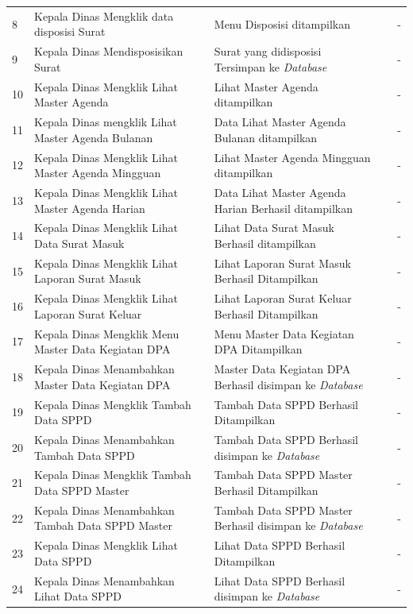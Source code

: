 \begin{enumerate}
{\begin{longtable}{p{0.5cm} p{4cm} p{5cm} p{0.5cm} p{1cm}}
			8 & Kepala Dinas Mengklik data disposisi Surat & Menu Disposisi ditampilkan & \checkmark & -\\
			9 & Kepala Dinas Mendisposisikan Surat  & Surat yang didisposisi Tersimpan ke \textit{Database} & \checkmark & -\\
			10 & Kepala Dinas Mengklik Lihat Master Agenda & Lihat Master Agenda ditampilkan & \checkmark & -\\		
			11 & Kepala Dinas mengklik Lihat Master Agenda Bulanan & Data Lihat Master Agenda Bulanan ditampilkan & \checkmark & -\\
			12 & Kepala Dinas Mengklik Lihat Master Agenda Mingguan & Lihat Master Agenda Mingguan ditampilkan  & \checkmark & -\\		
			13 & Kepala Dinas Mengklik Lihat Master Agenda Harian & Data Lihat Master Agenda Harian Berhasil ditampilkan  & \checkmark & -\\
			14 & Kepala Dinas Mengklik Lihat Data Surat Masuk & Lihat Data Surat Masuk Berhasil ditampilkan  & \checkmark & -\\
			15 & Kepala Dinas Mengklik Lihat Laporan  Surat Masuk & Lihat Laporan  Surat Masuk Berhasil Ditampilkan  & \checkmark & -\\
			16 & Kepala Dinas Mengklik Lihat Laporan Surat Keluar & Lihat Laporan Surat Keluar Berhasil Ditampilkan  & \checkmark & -\\
			17 & Kepala Dinas Mengklik Menu Master Data Kegiatan DPA & Menu Master Data Kegiatan DPA Ditampilkan  & \checkmark & -\\
			18 & Kepala Dinas Menambahkan Master Data Kegiatan DPA & Master Data Kegiatan DPA Berhasil disimpan ke \textit{Database}  & \checkmark & -\\
			19 & Kepala Dinas Mengklik Tambah Data SPPD & Tambah Data SPPD Berhasil Ditampilkan  & \checkmark & -\\
			20 & Kepala Dinas Menambahkan Tambah Data SPPD & Tambah Data SPPD Berhasil disimpan ke \textit{Database}  & \checkmark & -\\
			21 & Kepala Dinas Mengklik Tambah Data SPPD Master & Tambah Data SPPD Master Berhasil Ditampilkan  & \checkmark & -\\
			22 & Kepala Dinas Menambahkan Tambah Data SPPD Master & Tambah Data SPPD Master Berhasil disimpan ke \textit{Database}  & \checkmark & -\\
			23 & Kepala Dinas Mengklik Lihat Data SPPD & Lihat Data SPPD Berhasil Ditampilkan  & \checkmark & -\\
			24 & Kepala Dinas Menambahkan Lihat Data SPPD & Lihat Data SPPD Berhasil disimpan ke \textit{Database}  & \checkmark & -\\

\end{longtable}}
\end{enumerate}
